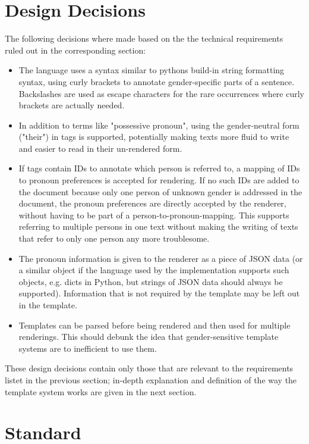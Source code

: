 \documentclass{article}
\begin{document}
\section{Design Decisions}

    The following decisions where made based on the the technical requirements ruled out in the corresponding section:

    \begin{itemize}
        \item The language uses a syntax similar to pythons build-in string formatting syntax, using curly brackets to annotate gender-specific parts of a sentence.
        Backslashes are used as escape characters for the rare occurrences where curly brackets are actually needed.
        \item In addition to terms like "possessive pronoun", using the gender-neutral form ("their") in tags is supported, potentially making texts more fluid to write and easier to read in their un-rendered form.
        \item If tags contain IDs to annotate which person is referred to, a mapping of IDs to pronoun preferences is accepted for rendering.
        If no such IDs are added to the document because only one person of unknown gender is addressed in the document, the pronoun preferences are directly accepted by the renderer, without having to be part of a person-to-pronoun-mapping.
        This supports referring to multiple persons in one text without making the writing of texts that refer to only one person any more troublesome.
        \item The pronoun information is given to the renderer as a piece of JSON data (or a similar object if the language used by the implementation supports such objects, e.g. dicts in Python, but strings of JSON data should always be supported).
        Information that is not required by the template may be left out in the template.
        \item Templates can be parsed before being rendered and then used for multiple renderings.
        This should debunk the idea that gender-sensitive template systems are to inefficient to use them.
    \end{itemize}

    These design decisions contain only those that are relevant to the requirements listet in the previous section;
    in-depth explanation and definition of the way the template system works are given in the next section.

\section{Standard}
\end{document}
